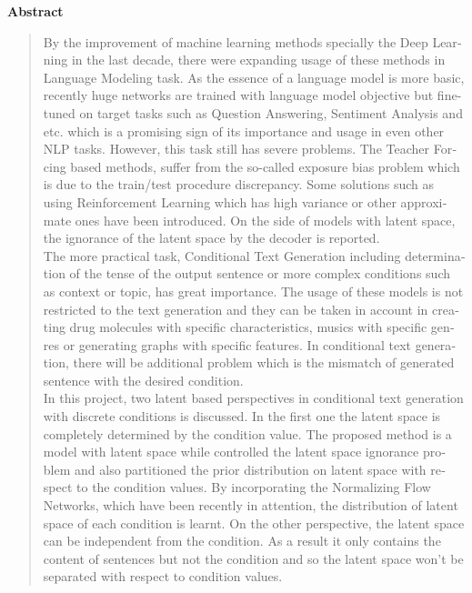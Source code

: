 \thispagestyle{empty} 

\begin{latin}
\centerline{\textbf{\large{Abstract}}}
\begin{quote}
    By the improvement of machine learning methods specially the Deep Learning in the last decade, there were expanding usage of these methods in Language Modeling task. As the essence of a language model is more basic, recently huge networks are trained with language model objective but fine-tuned on target tasks such as Question Answering, Sentiment Analysis and etc.
    which is a promising sign of its importance and usage in even other NLP tasks. However, this task still has severe problems. The Teacher Forcing based methods, suffer from the so-called exposure bias problem which is due to the train/test procedure discrepancy. Some solutions such as using Reinforcement Learning which has high variance or other approximate ones have been introduced. On the side of models with latent space, the ignorance of the latent space by the decoder is reported.
    \\
    The more practical task, Conditional Text Generation including determination of the tense of the output sentence or more complex conditions such as context or topic, has great importance. The usage of these models is not restricted to the text generation and they can be taken in account in creating drug molecules with specific characteristics, musics with specific genres or generating graphs with specific features. In conditional text generation, there will be additional problem which is the mismatch of generated sentence with the desired condition.
    \\
    In this project, two latent based perspectives in conditional text generation with discrete conditions is discussed. In the first one the latent space is completely determined by the condition value. The proposed method is a model with latent space while controlled the latent space ignorance problem and also partitioned the prior distribution on latent space with respect to the condition values. By incorporating the Normalizing Flow Networks, which have been recently in attention, the distribution of latent space of each condition is learnt. On the other perspective, the latent space can be independent from the condition. As a result it only contains the content of sentences but not the condition and so the latent space won't be separated with respect to condition values.
    \\

\end{quote}
\end{latin}
